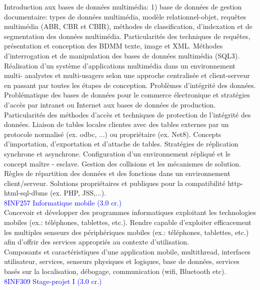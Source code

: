 Introduction aux bases de données multimédia: 1) base de données de gestion documentaire:
types de données multimédia, modèle relationnel-objet, requêtes multimédia (ABR, CBR et
CBIR), méthodes de classification, d'indexation et de segmentation des données multimédia.
Particularités des techniques de requêtes, présentation et conception des BDMM texte, image
et XML. Méthodes d'interrogation et de manipulation des bases de données multimédia
(SQL3). Réalisation d'un système d'applications multimédia dans un environnement multi-
analystes et multi-usagers selon une approche centralisée et client-serveur en passant par
toutes les étapes de conception. Problèmes d'intégrité des données. Problématique des bases
de données pour le commerce électronique et stratégies d'accès par intranet ou Internet aux
bases de données de production. Particularités des méthodes d'accès et techniques de protection de l'intégrité des données. Liaison de tables locales clientes avec des tables externes par un protocole normalisé (ex. odbc, ...) ou propriétaire (ex. Net8). Concepts d'importation, d'exportation et d'attache de tables. Stratégies de réplication synchrone et
asynchrone. Configuration d'un environnement répliqué et le concept maître - esclave. Gestion
des collisions et les mécanismes de solution. Règles de répartition des données et des
fonctions dans un environnement client/serveur. Solutions propriétaires et publiques pour la
compatibilité http-html-sql-dbms (ex. PHP, JSS,...).\\

\textcolor{blue}{8INF257 Informatique mobile (3.0 cr.)}\\

Concevoir et développer des programmes informatiques exploitant les technologies mobiles
(ex.: téléphones, tablettes, etc.). Rendre capable d'exploiter efficacement les multiples
senseurs des périphériques mobiles (ex.: téléphones, tablettes, etc.) afin d'offrir des services appropriés au contexte d'utilisation.\\

Composants et caractéristiques d'une application mobile, multithread, interfaces utilisateur,
services, senseurs physiques et logiques, base de données, services basés sur la localisation,
débogage, communication (wifi, Bluetooth etc).\\

\textcolor{blue}{8INF309 Stage-projet I (3.0 cr.)}\\

